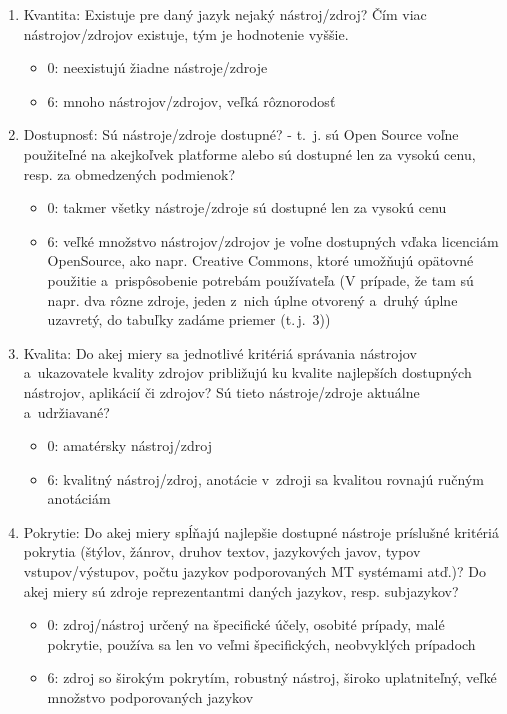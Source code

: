 \begin{multicols}{2}
\begin{enumerate}
\item Kvantita: Existuje pre daný jazyk nejaký nástroj/zdroj? Čím viac nástrojov/zdrojov existuje, tým je hodnotenie vyššie.
\begin{itemize}
\item 0: neexistujú žiadne nástroje/zdroje
\item 6: mnoho nástrojov/zdrojov, veľká rôznorodosť
\end{itemize}
\item Dostupnosť: Sú nástroje/zdroje dostupné? - t.~j. sú Open Source voľne použiteľné na akejkoľvek platforme alebo sú dostupné len za vysokú cenu, resp. za obmedzených podmienok?
\begin{itemize}
\item 0: takmer všetky nástroje/zdroje sú dostupné len za vysokú cenu
\item 6: veľké množstvo nástrojov/zdro\-jov je voľne dostupných vďaka licenciám OpenSource, ako napr. Creative Commons, ktoré umožňujú opätovné použitie a~prispôsobenie potrebám používateľa (V prípade, že tam sú napr. dva rôzne zdroje, jeden z~nich úplne otvorený a~druhý úplne uzavretý, do tabuľky zadáme priemer (t.\,j.~3))
\end{itemize}
\item Kvalita: Do akej miery sa jednotlivé kritériá správania nástrojov a~ukazovatele kvality zdrojov približujú ku kvalite najlepších dostupných nástrojov, aplikácií či zdrojov? Sú tieto nástroje/zdroje aktuálne a~udržiavané?
\begin{itemize}
\item 0: amatérsky nástroj/zdroj
\item 6: kvalitný nástroj/zdroj, anotácie v~zdroji sa kvalitou rovnajú ručným anotáciám
\end{itemize}
\item Pokrytie: Do akej miery spĺňajú najlepšie dostupné nástroje príslušné kritériá pokrytia (štýlov, žánrov, druhov textov, jazykových javov, typov vstupov/výstupov, počtu jazykov podporovaných MT systémami atď.)? Do akej miery sú zdroje reprezentantmi daných jazykov, resp. subjazykov?
\begin{itemize}
\item 0: zdroj/nástroj určený na špecifické účely, osobité prípady, malé pokrytie, používa sa len vo veľmi špecifických, neobvyklých prípadoch
\item 6: zdroj so širokým pokrytím, robustný nástroj, široko uplatniteľný, veľké množstvo podporovaných jazykov

\end{itemize}
\end{enumerate}
\end{multicols}
